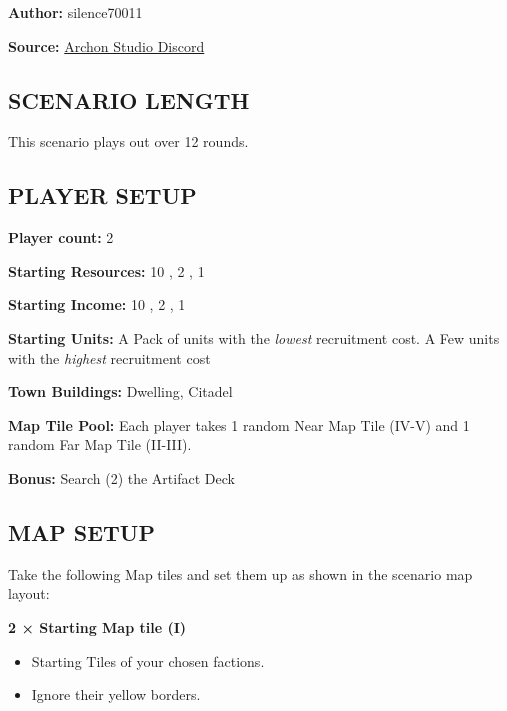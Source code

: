 
\begin{multicols*}{2}

\textbf{Author:} silence70011

\textbf{Source:} \href{https://discord.com/channels/740870068178649108/1233112440322002964/1233112440322002964}{Archon Studio Discord}

\subsection*{\MakeUppercase{Scenario length}}

This scenario plays out over 12 rounds.

\subsection*{\MakeUppercase{Player setup}}

\textbf{Player count:} 2

\textbf{Starting Resources:} 10 , 2 , 1 

\textbf{Starting Income:} 10 , 2 , 1 

\textbf{Starting Units:} 
    A Pack of  units with the \textit{lowest} recruitment cost. 
    A Few  units with the \textit{highest} recruitment cost 

\textbf{Town Buildings:}  Dwelling, Citadel

\textbf{Map Tile Pool:} Each player takes 1 random Near Map Tile (IV-V) and 1 random Far Map Tile (II-III).

\textbf{Bonus:} Search (2) the Artifact Deck 

\subsection*{\MakeUppercase{Map setup}}

Take the following Map tiles and set them up as shown in the scenario map layout:

\textbf{2 × Starting Map tile (I)}
\begin{itemize}
    \item Starting Tiles of your chosen factions.
    \item Ignore their yellow borders.
\end{itemize}


\end{multicols*}
